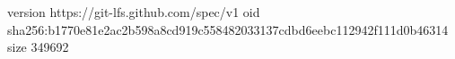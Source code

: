 version https://git-lfs.github.com/spec/v1
oid sha256:b1770e81e2ac2b598a8cd919c558482033137cdbd6eebc112942f111d0b46314
size 349692
